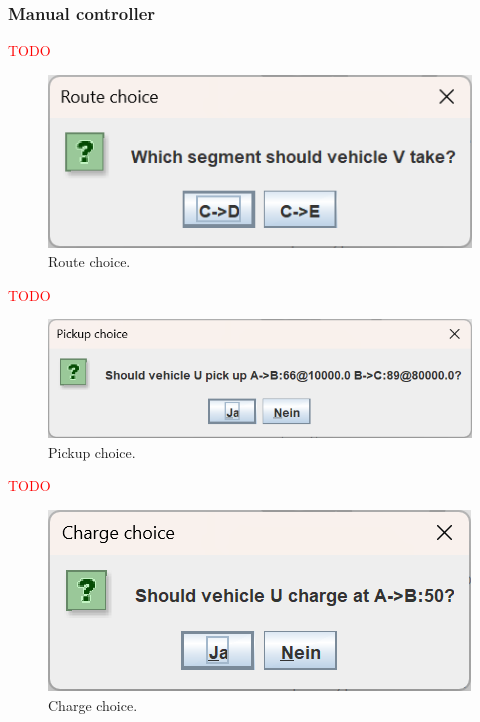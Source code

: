 \documentclass[10pt,twocolumn]{article}
\begin{document}
\subsubsection{Manual controller}
\label{sec:controller-manual}

\textcolor{red}{TODO}

\begin{figure}[h!]
    \centering
    \includegraphics[scale=0.4]{../../screenshots/manual-controller-route.png}
    \caption{Route choice.}
    \label{fig:manual-controller-route}
\end{figure}

\textcolor{red}{TODO}

\begin{figure}[h!]
    \centering
    \includegraphics[scale=0.4]{../../screenshots/manual-controller-demand.png}
    \caption{Pickup choice.}
    \label{fig:manual-controller-demand}
\end{figure}

\textcolor{red}{TODO}

\begin{figure}[h!]
    \centering
    \includegraphics[scale=0.4]{../../screenshots/manual-controller-charge.png}
    \caption{Charge choice.}
    \label{fig:manual-controller-charge}
\end{figure}
\end{document}
